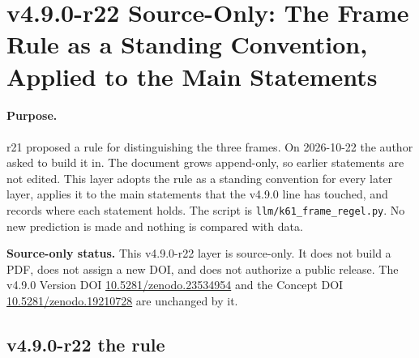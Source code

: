 \clearpage
\section*{v4.9.0-r22 Source-Only: The Frame Rule as a Standing Convention, Applied to the Main Statements}
\label{sec:v490-r22-frame-rule}

\paragraph{Purpose.}
r21 proposed a rule for distinguishing the three frames.  On 2026-10-22 the author asked to build it in.  The document grows
append-only, so earlier statements are not edited.  This layer adopts the rule as a standing convention for every later layer,
applies it to the main statements that the v4.9.0 line has touched, and records where each statement holds.  The script is
\texttt{llm/k61\_frame\_regel.py}.  No new prediction is made and nothing is compared with data.

\noindent\textbf{Source-only status.}
This v4.9.0-r22 layer is source-only.  It does not build a PDF, does not assign a new DOI,
and does not authorize a public release.  The v4.9.0 Version DOI
\href{https://doi.org/10.5281/zenodo.23534954}{10.5281/zenodo.23534954} and the Concept DOI
\href{https://doi.org/10.5281/zenodo.19210728}{10.5281/zenodo.19210728} are unchanged by it.

\subsection*{v4.9.0-r22 the rule}
\label{subsec:v490-r22-rule}

